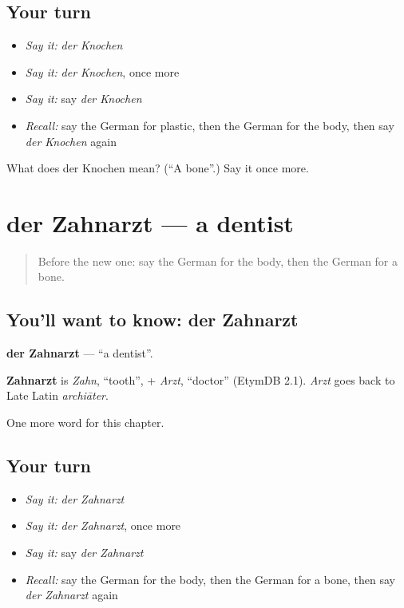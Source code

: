 \subsection*{Your turn}
\begin{itemize}
\raggedright
  \item \emph{Say it:} \emph{der Knochen}
  \item \emph{Say it:} \emph{der Knochen}, once more
  \item \emph{Say it:} say \emph{der Knochen}
  \item \emph{Recall:} say the German for plastic, then the German for the body, then say \emph{der Knochen} again
\end{itemize}

\begin{tcolorbox}[breakable,colback=teal!4,colframe=teal!35!black,title={Before you move on}]
What does der Knochen mean? (\textquotedblleft{}A bone\textquotedblright{}.) Say it once more.
\end{tcolorbox}
\section[der Zahnarzt]{der Zahnarzt — a dentist}

\label{lesson:GE-C205-zahnarzt}



\begin{quote}
Before the new one: say the German for the body, then the German for a bone.
\end{quote}

\subsection*{You'll want to know: der Zahnarzt}
\textbf{der Zahnarzt} — \textquotedblleft{}a dentist\textquotedblright{}.

\begin{cousinweb}
\textbf{Zahnarzt} is \emph{Zahn}, \textquotedblleft{}tooth\textquotedblright{}, + \emph{Arzt}, \textquotedblleft{}doctor\textquotedblright{} (EtymDB 2.1). \emph{Arzt} goes back to Late Latin \emph{archiāter}.
\end{cousinweb}

\begin{grammarlens}[title={What you've built}]
One more word for this chapter.
\end{grammarlens}

\subsection*{Your turn}
\begin{itemize}
\raggedright
  \item \emph{Say it:} \emph{der Zahnarzt}
  \item \emph{Say it:} \emph{der Zahnarzt}, once more
  \item \emph{Say it:} say \emph{der Zahnarzt}
  \item \emph{Recall:} say the German for the body, then the German for a bone, then say \emph{der Zahnarzt} again
\end{itemize}


